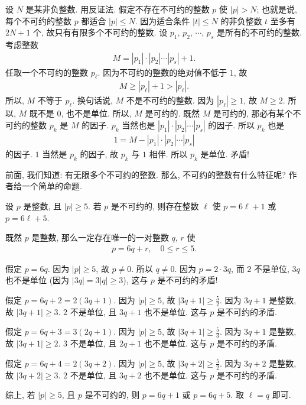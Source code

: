 \begin{pf}
    设 $N$ 是某非负整数. 用反证法. 假定不存在不可约的整数 $p$ 使 $|p| > N$; 也就是说, 每个不可约的整数 $p$ 都适合 $|p| \leq N$. 因为适合条件 $|t| \leq N$ 的非负整数 $t$ 至多有 $2N + 1$ 个, 故只有有限多个不可约的整数. 设 $p_1$, $p_2$, $\cdots$, $p_s$ 是所有的不可约的整数. 考虑整数
    \begin{align*}
        M = |p_1| \cdot |p_2| \cdots |p_s| + 1.
    \end{align*}
    任取一个不可约的整数 $p_\ell$. 因为不可约的整数的绝对值不低于 $1$, 故
    \begin{align*}
        M \geq |p_\ell| + 1 > |p_\ell|.
    \end{align*}
    所以, $M$ 不等于 $p_\ell$. 换句话说, $M$ 不是不可约的整数. 因为 $|p_\ell| \geq 1$, 故 $M \geq 2$. 所以, $M$ 既不是 $0$, 也不是单位. 所以, $M$ 是可约的. 既然 $M$ 是可约的, 那必有某个不可约的整数 $p_k$ 是 $M$ 的因子. $p_k$ 当然也是 $|p_1| \cdot |p_2| \cdots |p_s|$ 的因子. 所以 $p_k$ 也是
    \begin{align*}
        1 = M - |p_1| \cdot |p_2| \cdots |p_s|
    \end{align*}
    的因子. $1$ 当然是 $p_k$ 的因子, 故 $p_k$ 与 $1$ 相伴. 所以 $p_k$ 是单位. 矛盾!
\end{pf}

前面, 我们知道: 有无限多个不可约的整数. 那么, 不可约的整数有什么特征呢? 作者给一个简单的命题.

\begin{proposition}
    设 $p$ 是整数, 且 $|p| \geq 5$. 若 $p$ 是不可约的, 则存在整数 $\ell$ 使 $p = 6\ell + 1$ 或 $p = 6\ell + 5$.
\end{proposition}

\begin{pf}
    既然 $p$ 是整数, 那么一定存在唯一的一对整数 $q$, $r$ 使
    \begin{align*}
        p = 6q + r, \quad 0 \leq r \leq 5.
    \end{align*}

    假定 $p = 6q$. 因为 $|p| \geq 5$, 故 $p \neq 0$. 所以 $q \neq 0$. 因为 $p = 2 \cdot 3q$, 而 $2$ 不是单位, $3q$ 也不是单位 (因为 $|3q| = 3|q| \geq 3$), 这与 $p$ 是不可约的矛盾!

    假定 $p = 6q + 2 = 2(3q + 1)$. 因为 $|p| \geq 5$, 故 $|3q + 1| \geq \frac{5}{2}$. 因为 $3q + 1$ 是整数, 故 $|3q + 1| \geq 3$. $2$ 不是单位, 且 $3q + 1$ 也不是单位. 这与 $p$ 是不可约的矛盾.

    假定 $p = 6q + 3 = 3(2q + 1)$. 因为 $|p| \geq 5$, 故 $|3q + 1| \geq \frac{5}{3}$. 因为 $3q + 1$ 是整数, 故 $|3q + 1| \geq 2$. $3$ 不是单位, 且 $2q + 1$ 也不是单位. 这与 $p$ 是不可约的矛盾.

    假定 $p = 6q + 4 = 2(3q + 2)$. 因为 $|p| \geq 5$, 故 $|3q + 2| \geq \frac{5}{2}$. 因为 $3q + 2$ 是整数, 故 $|3q + 2| \geq 3$. $2$ 不是单位, 且 $3q + 2$ 也不是单位. 这与 $p$ 是不可约的矛盾.

    综上, 若 $|p| \geq 5$, 且 $p$ 是不可约的, 则 $p = 6q + 1$ 或 $p = 6q + 5$. 取 $\ell = q$ 即可.
\end{pf}

